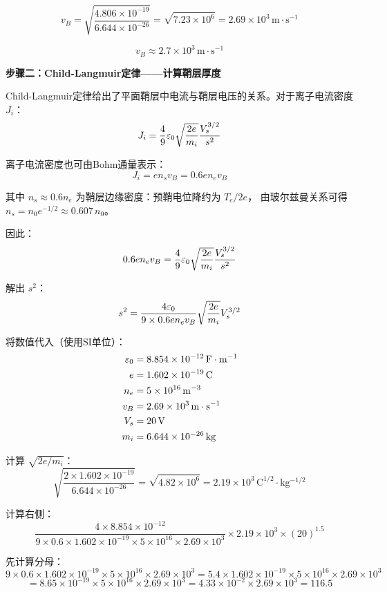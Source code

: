 \[
    v_B = \sqrt{\frac{4.806\times10^{-19}}{6.644\times10^{-26}}} = \sqrt{7.23\times10^6} = 2.69\times10^3\,\mathrm{m\cdot s^{-1}}
\]

\[
    \boxed{v_B \approx 2.7\times10^3\,\mathrm{m\cdot s^{-1}}}
\]

\textbf{步骤二：Child-Langmuir定律——计算鞘层厚度}

Child-Langmuir定律给出了平面鞘层中电流与鞘层电压的关系。对于离子电流密度 $J_i$：
\begin{equation}
    J_i = \frac{4}{9}\varepsilon_0 \sqrt{\frac{2e}{m_i}} \frac{V_s^{3/2}}{s^2}
\label{eq:ch11-child-langmuir}
\end{equation}

离子电流密度也可由Bohm通量表示：
\[
    J_i = e n_s v_B = 0.6 e n_e v_B
\]

其中 $n_s \approx 0.6 n_e$ 为鞘层边缘密度：预鞘电位降约为 $T_e/2e$，
由玻尔兹曼关系可得 $n_s = n_0 e^{-1/2} \approx 0.607\,n_0$。

因此：
\[
    0.6 e n_e v_B = \frac{4}{9}\varepsilon_0 \sqrt{\frac{2e}{m_i}} \frac{V_s^{3/2}}{s^2}
\]

解出 $s^2$：
\[
    s^2 = \frac{4\varepsilon_0}{9 \times 0.6 e n_e v_B} \sqrt{\frac{2e}{m_i}} V_s^{3/2}
\]

将数值代入（使用SI单位）：
\begin{align*}
    \varepsilon_0 &= 8.854\times10^{-12}\,\mathrm{F\cdot m^{-1}} \\
    e &= 1.602\times10^{-19}\,\mathrm{C} \\
    n_e &= 5\times10^{16}\,\mathrm{m^{-3}} \\
    v_B &= 2.69\times10^3\,\mathrm{m\cdot s^{-1}} \\
    V_s &= 20\,\mathrm{V} \\
    m_i &= 6.644\times10^{-26}\,\mathrm{kg}
\end{align*}

计算 $\sqrt{2e/m_i}$：
\[
    \sqrt{\frac{2\times1.602\times10^{-19}}{6.644\times10^{-26}}} = \sqrt{4.82\times10^6} = 2.19\times10^3\,\mathrm{C^{1/2}\cdot kg^{-1/2}}
\]

计算右侧：
\[
    \frac{4\times8.854\times10^{-12}}{9\times0.6\times1.602\times10^{-19}\times5\times10^{16}\times2.69\times10^3} \times 2.19\times10^3 \times (20)^{1.5}
\]

先计算分母：
\[
    9\times0.6\times1.602\times10^{-19}\times5\times10^{16}\times2.69\times10^3 = 5.4\times1.602\times10^{-19}\times5\times10^{16}\times2.69\times10^3
\]
\[
    = 8.65\times10^{-19}\times5\times10^{16}\times2.69\times10^3 = 4.33\times10^{-2}\times2.69\times10^3 = 116.5
\]

